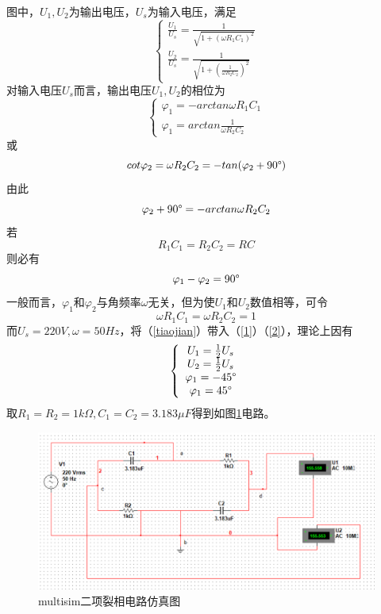 \documentclass[12pt]{article}%
\begin{document}
图中，$U_1,U_2$为输出电压，$U_s$为输入电压，满足
\begin{equation}\label{1}
\left\{ 
\begin{array}{c}
\frac{U_1}{U_s}=\frac{1}{\sqrt{1+(\omega R_1C_1)^2}} \\
\frac{U_2}{U_s}=\frac{1}{\sqrt{1+\left(\frac{1}{\omega R_2C_2}\right)^2}}
\end{array} \right.  
\end{equation}
对输入电压$U_s$而言，输出电压$U_1,U_2$的相位为
\begin{equation}\label{2}
\left\{ 
\begin{array}{c}
\varphi_1=-arctan\omega R_1C_1 \\
\varphi_1=arctan\frac{1}{\omega R_2C_2}
\end{array} \right.  
\end{equation}
或
\begin{equation}\label{}
cot\varphi_2=\omega R_2C_2=-tan(\varphi_2+90\degree)
\end{equation}
由此
\begin{equation}\label{}
\varphi_2+90\degree=-arctan\omega R_2C_2
\end{equation}
若
\begin{equation}\label{}
R_1C_1=R_2C_2=RC
\end{equation}
则必有
\begin{equation}\label{}
\varphi_1-\varphi_2=90\degree
\end{equation}
一般而言，$\varphi_1$和$\varphi_2$与角频率$\omega$无关，但为使$U_1$和$U_2$数值相等，可令
\begin{equation}\label{tiaojian}
\omega R_1C_1=\omega R_2C_2=1
\end{equation}
而$U_s=220V,\omega =50Hz$，将（\ref{tiaojian}）带入（\ref{1}）（\ref{2}），理论上因有
\begin{equation}\label{jieguo1}
\left\{ 
\begin{array}{c}
U_1=\frac{1}{2}U_s \\
U_2=\frac{1}{2}U_s \\
\varphi_1=-45\degree\\
\varphi_1=45\degree
\end{array} \right.  
\end{equation}
取$R_1=R_2=1k\Omega ,C_1=C_2=3.183\mu F$得到如图\ref{fig:3}电路。
\begin{figure}[htbp]
\centering\includegraphics[width=\linewidth]{TIM20180531145325.png}
\caption{\heiti{}multisim二项裂相电路仿真图}\label{fig:3}
\end{figure}
\end{document}

